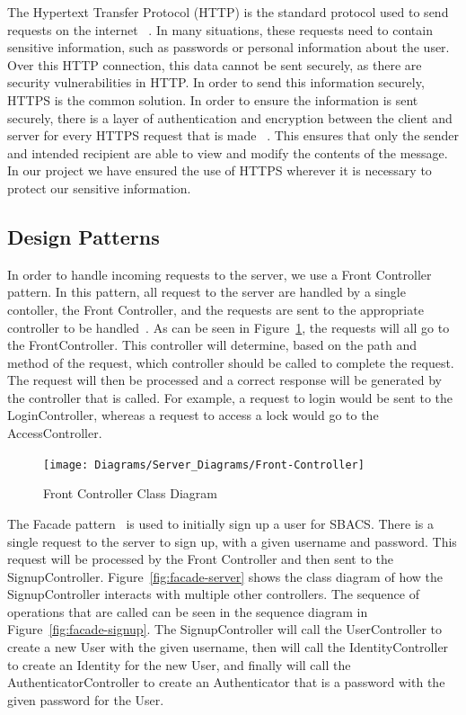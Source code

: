 \documentclass[12pt]{report}
\let\Oldsubsection\subsection
\renewcommand{\subsection}{\FloatBarrier\Oldsubsection}
\begin{document}
The Hypertext Transfer Protocol (HTTP) is the standard protocol used to send requests on the internet ~\autocite{HTTPREF}.
In many situations, these requests need to contain sensitive information, such as passwords or personal
information about the user. Over this HTTP connection, this data cannot be sent securely, as there are
security vulnerabilities in HTTP. In order to send this information securely, HTTPS is the common
solution. In order to ensure the information is sent securely, there is a layer of authentication
and encryption between the client and server for every HTTPS request that is made ~\autocite{HTTPSVSHTTP}. This ensures that
only the sender and intended recipient are able to view and modify the contents of the message. In our
project we have ensured the use of HTTPS wherever it is necessary to protect our sensitive information.


\subsection{Design Patterns} \label{design-patterns}


In order to handle incoming requests to the server, we use a Front Controller pattern. In this pattern,
all request to the server are handled by a single contoller, the Front Controller, and the requests
are sent to the appropriate controller to be handled~\autocite{FRONTCONTROLLER}. As can be seen in
Figure~\ref{fig:front-controller},
the requests will all go to the FrontController. This controller will determine, based on the path and
method of the request, which controller should be called to complete the request. The request will then
be processed and a correct response will be generated by the controller that is called. For example,
a request to login would be sent to the LoginController, whereas a request to access a lock would go 
to the AccessController.

\begin{figure}
    \texttt{[image: Diagrams/Server\_Diagrams/Front-Controller]}
    \caption{Front Controller Class Diagram}
    \label{fig:front-controller}
\end{figure}

The Facade pattern~\autocite{DESIGNPATTERNSGOF} is used to initially sign up a user for SBACS. There is a single request to the
server to sign up, with a given username and password. This request will be processed by the
Front Controller and then sent to the SignupController. Figure~\ref{fig:facade-server} shows the
class diagram of how the SignupController interacts with multiple other controllers. The sequence
of operations that are called can be seen in the sequence diagram in Figure~\ref{fig:facade-signup}.
The SignupController will call the UserController
to create a new User with the given username, then will call the IdentityController to create an Identity
for the new User, and finally will call the AuthenticatorController to create an Authenticator that is
a password with the given password for the User. 
\end{document}
